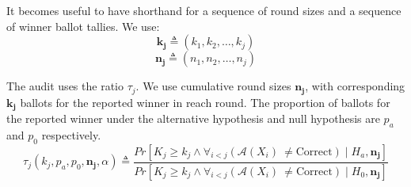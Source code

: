 \begin{comment}
\begin{definition}[$(\alpha,p)$-\BRAVO ]\label{def:bravo}  An audit $\mathcal{A}$ is the \B~$(\alpha, p)$-\BRAVO audit iff the following stopping condition is tested at each ballot draw. If the sample $X$ is of size $n$ and has $k$ ballots for the winner,  
\begin{equation}
    \mathcal{A}(X) =  \left\{ \begin{array}{ll} \text{Correct} & ~\sigma(k, p, \frac{1}{2}, n) 
        \geq \frac{1}{\alpha}\\
        Undetermined & ~else 
    \end{array}
    \right .
    \label{eqn:bravo}
\end{equation}
\end{definition}
\end{comment}

It becomes useful to have shorthand for a sequence of round sizes and a sequence
of winner ballot tallies.
We use:
$$\bm{k_j}\triangleq(k_1,k_2,\ldots,k_j)$$
$$\bm{n_j}\triangleq(n_1,n_2,\ldots,n_j)$$

\begin{definition} \label{def:minerva_ratio} The \R \Minerva audit uses the ratio $\tau_j$. We use cumulative round sizes $\bm{n_j}$, with corresponding $\bm{k_j}$ ballots for the reported winner in reach round. The proportion of ballots for the reported winner under the alternative hypothesis and null hypothesis are $p_a$ and $p_0$ respectively.
         \begin{equation}
             \label{eqn:tau}
                 \tau_{j}(k_{j}, p_a,p_0, \bm{n_j}, \alpha )  \triangleq
                 \frac{Pr[K_{j} \geq k_{j} \wedge \forall_{i < j} ({\mathcal{A}}(X_i) ~\neq \text{Correct}) \mid H_a, \bm{n_j}]}{Pr[K_{j} \geq k_{j} \wedge \forall_{i < j} ({\mathcal{A}}(X_i) ~\neq \text{Correct}) \mid H_0, \bm{n_j}]}
         \end{equation}
\end{definition}

